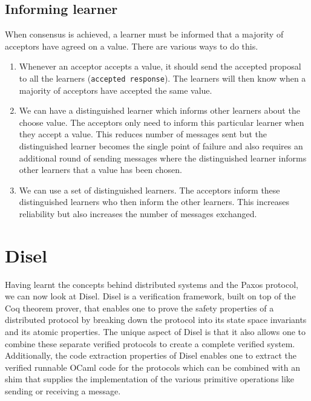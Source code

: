 \vspace{-4mm}
\subsection{Informing learner}
When consensus is achieved, a learner must be informed that a majority of acceptors
have agreed on a value. There are various ways to do this.

\begin{enumerate}
  \item Whenever an acceptor accepts a value, it should send the accepted proposal
    to all the learners (\texttt{accepted response}).
    The learners will then know when a majority of acceptors
    have accepted the same value.
  \item We can have a distinguished learner which informs other learners about
    the choose value. The acceptors only need to inform this particular learner
    when they accept a value. This reduces number of messages sent but the
    distinguished learner becomes the single point of failure and also requires
    an additional round of sending messages where the distinguished learner informs
    other learners that a value has been chosen.
  \item We can use a set of distinguished learners. The acceptors inform these
    distinguished learners who then inform the other learners. This increases
    reliability but also increases the number of messages exchanged.
\end{enumerate}

\vspace{-5mm}
\section{Disel}
Having learnt the concepts behind distributed systems and the Paxos protocol, we
can now look at Disel.
Disel \cite{9} is a verification framework, built on top of the Coq theorem prover,
that enables one to prove the safety properties of a distributed protocol by
breaking down the protocol into its state space invariants and its atomic properties.
The unique aspect of Disel is that it also allows one to combine these separate
verified protocols to create a complete verified system. Additionally, the
code extraction properties of Disel enables one to extract the verified runnable
OCaml code for the protocols which can be combined with an shim that supplies
the implementation of the various primitive operations like sending or receiving
a message.

